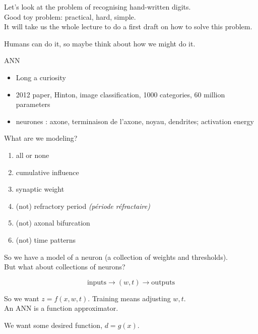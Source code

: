 
\usepackage{epsfig}



Let's look at the problem of recognising hand-written digits. \\
Good toy problem: practical, hard, simple. \\
It will take us the whole lecture to do a first draft on how to solve
this problem.

Humans can do it, so maybe think about how we might do it.



ANN
\begin{itemize}
\item Long a curiosity
\item 2012 paper, Hinton, image classification, 1000 categories, 60 million parameters
\item neurones : axone, terminaison de l'axone, noyau, dendrites; activation energy
\end{itemize}




\bigskip

What are we modeling?
\begin{enumerate}
\item all or none
\item cumulative influence
\item synaptic weight
\item (not) refractory period \textit{(période réfractaire)}
\item (not) axonal bifurcation
\item (not) time patterns
\end{enumerate}

So we have a model of a neuron (a collection of weights and thresholds).\\
But what about collections of neurons?

\begin{displaymath}
  \mbox{inputs} \rightarrow (w, t) \rightarrow \mbox{outputs}
\end{displaymath}

So we want $z = f(x, w, t)$.  Training means adjusting $w, t$.\\
An ANN is a function approximator.

We want some desired function, $d = g(x)$.



